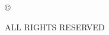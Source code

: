 \vspace*{6in}
\begin{center}
\normalsize{
\copyright \hspace{0.02in} \MyDegreeAwardYear

\MakeUppercase{\MyName}

ALL RIGHTS RESERVED
}
\end{center}
